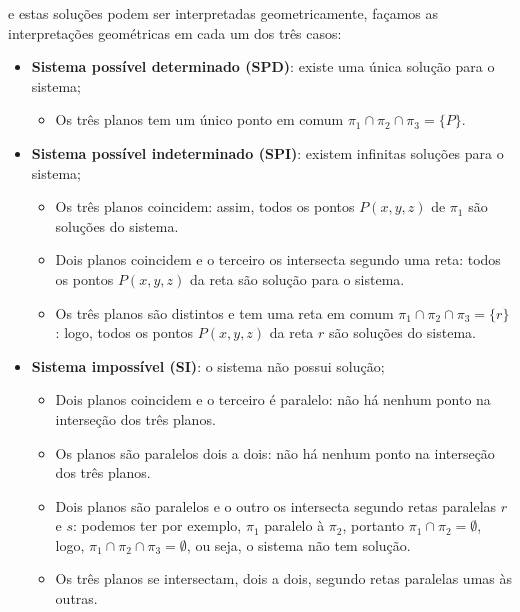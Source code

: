  e estas soluções podem ser interpretadas geometricamente, façamos as interpretações geométricas em cada um dos três casos:
 \begin{itemize}
  \item \textbf{Sistema possível determinado (SPD)}: existe uma única solução para o sistema;
  \begin{itemize}
    \item  Os três planos tem um único ponto em comum $\pi_1 \cap \pi_2 \cap \pi_3= \{P\}$.
  \end{itemize}

  \item \textbf{Sistema possível indeterminado (SPI)}: existem infinitas soluções para o sistema;
  \begin{itemize}
    \item Os três planos coincidem: assim, todos os pontos $P(x, y, z)$ de $\pi_1$ são soluções do sistema.

    \item Dois planos coincidem e o terceiro os intersecta segundo uma reta: todos os pontos $P(x, y, z)$ da reta são solução para o sistema.

    \item Os três planos são distintos e tem uma reta em comum $\pi_1 \cap \pi_2 \cap \pi_3= \{r\}$: logo, todos os pontos $P(x, y, z)$ da reta $r$ são soluções do sistema.
  \end{itemize}

  \item \textbf{Sistema impossível (SI)}: o sistema não possui solução;
  \begin{itemize}
  \item Dois planos coincidem e o terceiro é paralelo: não há nenhum ponto na interseção dos três planos.

  \item Os planos são paralelos dois a dois: não há nenhum ponto na interseção dos três planos.

  \item Dois planos são paralelos e o outro os intersecta segundo retas paralelas $r$ e $s$: podemos ter por exemplo, $\pi_1$ paralelo à $\pi_2$, portanto $\pi_1 \cap \pi_2 = \emptyset$,  logo, $\pi_1 \cap \pi_2 \cap \pi_3 = \emptyset$, ou seja, o sistema não tem solução.

  \item Os três planos se intersectam, dois a dois, segundo retas paralelas umas às outras.
  \end{itemize}

 \end{itemize}
